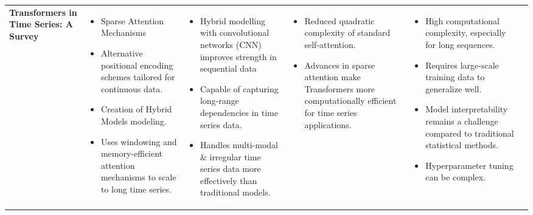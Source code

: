 \documentclass{article}
\begin{document}
\begin{adjustbox}{width=\textwidth}
\begin{tabular}{|p{}|p{}|p{}|p{}|p{}|p{}|}
    \large \textbf{Transformers in Time Series: A Survey} & 
    \begin{itemize}[leftmargin=*]
        \item Sparse Attention Mechanisms 
        \item Alternative positional encoding schemes tailored for continuous data.
        \item Creation of Hybrid Models modeling.
        \item Uses windowing and memory-efficient attention mechanisms to scale to long time series.
    \end{itemize} & 
    \begin{itemize}[leftmargin=*]
        \item Hybrid modelling with convolutional networks (CNN) improves strength in sequential data
        \item Capable of capturing long-range dependencies in time series data.
        \item Handles multi-modal \& irregular time series data more effectively than traditional models.
    \end{itemize} & 
    \begin{itemize}[leftmargin=*]
        \item Reduced quadratic complexity of standard self-attention. 
        \item Advances in sparse attention make Transformers more computationally efficient for time series applications.
    \end{itemize} & 
    \begin{itemize}[leftmargin=*]
        \item High computational complexity, especially for long sequences.
        \item Requires large-scale training data to generalize well.
        \item Model interpretability remains a challenge compared to traditional statistical methods.
        \item Hyperparameter tuning can be complex.
    \end{itemize} & 
    

\end{tabular}
\end{adjustbox}
\end{document}
